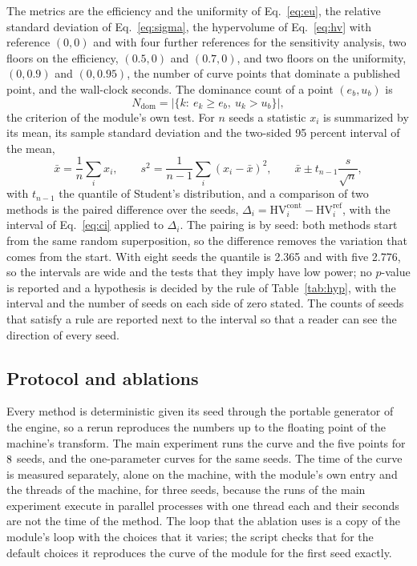 The metrics are the efficiency and the uniformity of Eq.~\ref{eq:eu}, the relative standard deviation of Eq.~\ref{eq:sigma}, the hypervolume of Eq.~\ref{eq:hv} with reference $(0,0)$ and with four further references for the sensitivity analysis, two floors on the efficiency, $(0.5,0)$ and $(0.7,0)$, and two floors on the uniformity, $(0,0.9)$ and $(0,0.95)$, the number of curve points that dominate a published point, and the wall-clock seconds. The dominance count of a point $(e_b,u_b)$ is
\begin{equation}
N_{\mathrm{dom}}=\big|\{k:\ e_k\ge e_b,\ u_k>u_b\}\big|,\label{eq:ndom}
\end{equation}
the criterion of the module's own test. For $n$ seeds a statistic $x_i$ is summarized by its mean, its sample standard deviation and the two-sided 95 percent interval of the mean,
\begin{equation}
\bar x=\frac1n\sum_ix_i,\qquad s^2=\frac1{n-1}\sum_i(x_i-\bar x)^2,\qquad \bar x\pm t_{n-1}\frac{s}{\sqrt n},\label{eq:ci}
\end{equation}
with $t_{n-1}$ the quantile of Student's distribution, and a comparison of two methods is the paired difference over the seeds, $\Delta_i=\mathrm{HV}^{\mathrm{cont}}_i-\mathrm{HV}^{\mathrm{ref}}_i$, with the interval of Eq.~\ref{eq:ci} applied to $\Delta_i$. The pairing is by seed: both methods start from the same random superposition, so the difference removes the variation that comes from the start.
With eight seeds the quantile is 2.365 and with five 2.776, so the intervals are wide and the tests that they imply have low power; no $p$-value is reported and a hypothesis is decided by the rule of Table~\ref{tab:hyp}, with the interval and the number of seeds on each side of zero stated. The counts of seeds that satisfy a rule are reported next to the interval so that a reader can see the direction of every seed.

\subsection{Protocol and ablations}\label{sec:protocol}

Every method is deterministic given its seed through the portable generator of the engine, so a rerun reproduces the numbers up to the floating point of the machine's transform. The main experiment runs the curve and the five points for $8$ seeds, and the one-parameter curves for the same seeds. The time of the curve is measured separately, alone on the machine, with the module's own entry and the threads of the machine, for three seeds,
because the runs of the main experiment execute in parallel processes with one thread each and their seconds are not the time of the method. The loop that the ablation uses is a copy of the module's loop with the choices that it varies; the script checks that for the default choices it reproduces the curve of the module for the first seed exactly.

